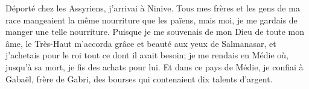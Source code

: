 Déporté chez les Assyriens, j’arrivai à Ninive.
Tous mes frères et les gens de ma race mangeaient la même nourriture que les païens,
	mais moi, je me gardais de manger une telle nourriture.
Puisque je me souvenais de mon Dieu de toute mon âme,
	le Très-Haut m’accorda grâce et beauté aux yeux de Salmanasar,
	et j’achetais pour le roi tout ce dont il avait besoin;
	je me rendais en Médie où, jusqu’à sa mort, je fis des achats pour lui.
Et dans ce pays de Médie, je confiai à Gabaël, frère de Gabri,
	des bourses qui contenaient dix talents d’argent.
